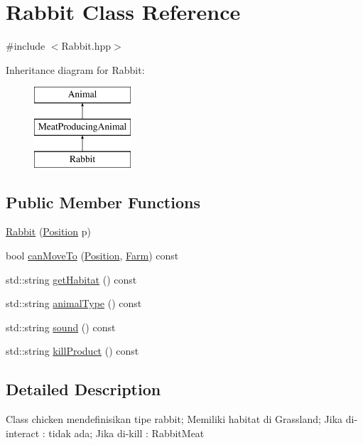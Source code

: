 \hypertarget{class_rabbit}{}\section{Rabbit Class Reference}
\label{class_rabbit}


{\ttfamily \#include $<$Rabbit.\+hpp$>$}

Inheritance diagram for Rabbit\+:\begin{figure}[H]
\begin{center}
\leavevmode
\includegraphics[height=3.000000cm]{class_rabbit}
\end{center}
\end{figure}
\subsection*{Public Member Functions}
\begin{DoxyCompactItemize}
\item 
\mbox{\hyperlink{class_rabbit_a524dc1e292bc748391550c81ae81336b}{Rabbit}} (\mbox{\hyperlink{class_position}{Position}} p)
\item 
bool \mbox{\hyperlink{class_rabbit_aedf048f173d55caa45576081f93dc931}{can\+Move\+To}} (\mbox{\hyperlink{class_position}{Position}}, \mbox{\hyperlink{class_farm}{Farm}}) const
\item 
std\+::string \mbox{\hyperlink{class_rabbit_a2bb761dcc6979ff6db93d253fbe7a3b0}{get\+Habitat}} () const
\item 
std\+::string \mbox{\hyperlink{class_rabbit_a26169c2de4f8cf4f72d51c0796b96a37}{animal\+Type}} () const
\item 
std\+::string \mbox{\hyperlink{class_rabbit_aa60f2e9bf2ca051d092c79c161b988b6}{sound}} () const
\item 
std\+::string \mbox{\hyperlink{class_rabbit_a982b868df58d7ad6e7b4814f5fbe1473}{kill\+Product}} () const
\end{DoxyCompactItemize}


\subsection{Detailed Description}
Class chicken mendefinisikan tipe rabbit; Memiliki habitat di Grassland; Jika di-\/interact \+: tidak ada; Jika di-\/kill \+: Rabbit\+Meat 

